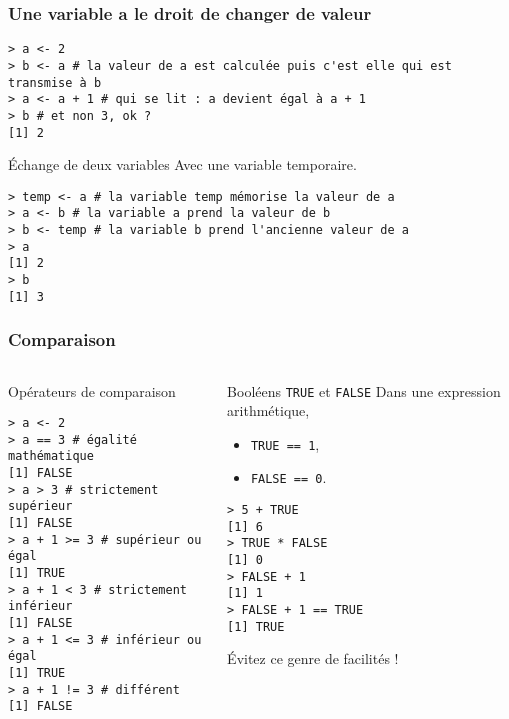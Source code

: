 \documentclass[10pt]{beamer}
\begin{document}
\begin{frame}[fragile]
  \frametitle{Une variable a le droit de changer de valeur}

  \begin{lstlisting}
> a <- 2
> b <- a # la valeur de a est calculée puis c'est elle qui est transmise à b
> a <- a + 1 # qui se lit : a devient égal à a + 1
> b # et non 3, ok ?
[1] 2
\end{lstlisting}


\begin{exampleblock}{Échange de deux variables}
  Avec une variable temporaire.
  \begin{lstlisting}[style=block]
> temp <- a # la variable temp mémorise la valeur de a
> a <- b # la variable a prend la valeur de b
> b <- temp # la variable b prend l'ancienne valeur de a
> a
[1] 2
> b
[1] 3
  \end{lstlisting}
\end{exampleblock}
\end{frame}

\begin{frame}[fragile]
  \frametitle{Comparaison}

\begin{columns}[t]
\begin{column}{0.59\textwidth}
  \begin{block}{Opérateurs de comparaison}
  \begin{lstlisting}[style=block]
> a <- 2
> a == 3 # égalité mathématique
[1] FALSE
> a > 3 # strictement supérieur
[1] FALSE
> a + 1 >= 3 # supérieur ou égal
[1] TRUE
> a + 1 < 3 # strictement inférieur
[1] FALSE
> a + 1 <= 3 # inférieur ou égal
[1] TRUE
> a + 1 != 3 # différent
[1] FALSE
  \end{lstlisting}
\end{block}
\end{column}
\begin{column}{0.39\textwidth}
  \begin{block}{Booléens \texttt{TRUE} et \texttt{FALSE}}
    Dans une expression arithmétique,
    \begin{itemize}
    \item \texttt{TRUE == 1},
    \item \texttt{FALSE == 0}.
    \end{itemize}
  \begin{lstlisting}
> 5 + TRUE
[1] 6
> TRUE * FALSE
[1] 0
> FALSE + 1
[1] 1
> FALSE + 1 == TRUE
[1] TRUE
\end{lstlisting}
\alert{Évitez ce genre de facilités !}
  \end{block}
\end{column}
\end{columns}
\end{frame}
\end{document}
